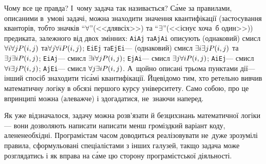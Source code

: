 {Чому все це правда? І~чому задача так називається?
С\'{а}ме за правилами, описаними в~умові задачі, можна знаходити значення квантифікації 
(застосування кванторів, тобто значків 
``$\forall$''\nolinebreak[3] (<<для\nolinebreak[3] всіх>>)
та 
``$\exists$''\nolinebreak[3] (<<існує хоча~б один>>)) предиката, залежного від двох змінних: 
\texttt{AiAj} та\nolinebreak[3] \texttt{AjAi} описують (однаковий) смисл 
$\forall{}i\forall{}jP(i,j)$ та\nolinebreak[2] $\forall{}j\forall{}iP(i,j)$;
%
\hspace{0.25em plus 0.25em}
%
\texttt{EiEj} та\nolinebreak[3] \texttt{EjEi}\nolinebreak[3] --- (однаковий) смисл
$\exists{}i\exists{}jP(i,j)$ та\nolinebreak[2] $\exists{}j\exists{}iP(i,j)$;
%
\hspace{0.25em plus 0.25em}
%
\texttt{EiAj}\nolinebreak[3] --- смисл $\exists{}i\forall{}jP(i,j)$;
%
\hspace{0.25em plus 0.25em}
%
\texttt{EjAi}\nolinebreak[3] --- смисл $\exists{}j\forall{}iP(i,j)$;
%
\hspace{0.25em plus 0.25em}
%
\texttt{AiEj}\nolinebreak[3] --- смисл $\forall{}i\exists{}jP(i,j)$;
%                                      
\hspace{0.25em plus 0.25em}                
%                                      
\texttt{AjEi}\nolinebreak[3] --- смисл $\forall{}j\exists{}iP(i,j)$. 
%
А~щойно описані трьома пунктами дії\nolinebreak[3] --- інший спосіб знаходити ті\nolinebreak[3] с\'{а}мі квантифікації. Й\nolinebreak[3] це\nolinebreak[2] відомо тим, хто ретельно вивчив математичну логіку в обсязі першого курсу університету.
Само собою, про це в\nolinebreak[3] принципі можна (але\nolinebreak[3] важче) і здогадатися, не~знаючи наперед.

Як уже відзначалося, задачу можна розв'язати й без\nolinebreak[2] цих\nolinebreak[2] знань математичної логіки\nolinebreak[3] --- вони дозволяють написати написати менш громіздкий варіант коду, але\nolinebreak[3] не\nolinebreak[3] необхідні. Програмістам часом доводиться реалізовувати не~дуже зрозумілі правила, сформульовані спеціалістами з інших галузей, так\nolinebreak[2] що задача може розглядатись і як вправа на с\'{а}ме цю сторону програмістської діяльності.

}